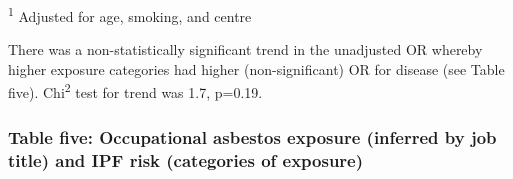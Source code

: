 \documentclass[
]{article}
\begin{document}
\textsuperscript{1} Adjusted for age, smoking, and centre

There was a non-statistically significant trend in the unadjusted OR
whereby higher exposure categories had higher (non-significant) OR for
disease (see Table five). Chi\textsuperscript{2} test for trend was 1.7,
p=0.19.

\newpage

\hypertarget{table-five-occupational-asbestos-exposure-inferred-by-job-title-and-ipf-risk-categories-of-exposure}{%
\subsubsection{Table five: Occupational asbestos exposure (inferred by
job title) and IPF risk (categories of
exposure)}\label{table-five-occupational-asbestos-exposure-inferred-by-job-title-and-ipf-risk-categories-of-exposure}}
\end{document}
